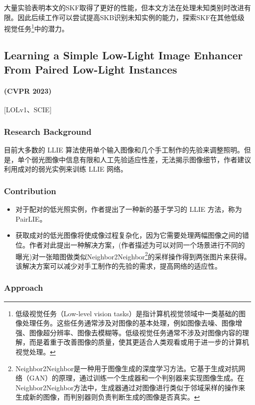 \documentclass[letterpaper,10pt]{article}
\begin{document}
			大量实验表明本文的SKF取得了更好的性能，但本文方法在处理未知类别时改进有限。因此后续工作可以尝试提高SKB识别未知实例的能力，探索SKF在其他低级视觉任务\footnote{低级视觉任务（Low-level vision tasks）是指计算机视觉领域中一类基础的图像处理任务。这些任务通常涉及对图像的基本处理，例如图像去噪、图像增强、图像超分辨率、图像去模糊等。低级视觉任务通常不涉及对图像内容的理解，而是着重于改善图像的质量，使其更适合人类观看或用于进一步的计算机视觉处理。}中的潜力。
	
		\subsection{Learning a Simple Low-Light Image Enhancer From Paired Low-Light Instances}
		\paragraph{(CVPR 2023)} [LOLv1、SCIE]
			
			\subsubsection{Research Background}
			
			目前大多数的 LLIE 算法使用单个输入图像和几个手工制作的先验来调整照明。但是，单个弱光图像中信息有限和人工先验适应性差，无法揭示图像细节，作者建议利用成对的弱光实例来训练 LLIE 网络。
	
			\subsubsection{Contribution}
			
			\begin{itemize}
				\item [(1)]
				对于配对的低光照实例，作者提出了一种新的基于学习的 LLIE 方法，称为 PairLIE。
				\item [(2)]
				获取成对的低光图像将使成像过程复杂化，因为它需要处理两幅图像之间的错位。作者对此提出一种解决方案，(作者描述为可以对同一个场景进行不同的曝光)对一张暗图做类似Neighbor2Neighbor\footnote{Neighbor2Neighbor是一种用于图像生成的深度学习方法。它基于生成对抗网络（GAN）的原理，通过训练一个生成器和一个判别器来实现图像生成。在Neighbor2Neighbor方法中，生成器通过对图像进行类似于邻域采样的操作来生成新的图像，而判别器则负责判断生成的图像是否真实。}的采样操作得到两张图片来获得。该解决方案可以减少对手工制作的先验的需求，提高网络的适应性。
			\end{itemize}
	
			\subsubsection{Approach}
			
\end{document}
